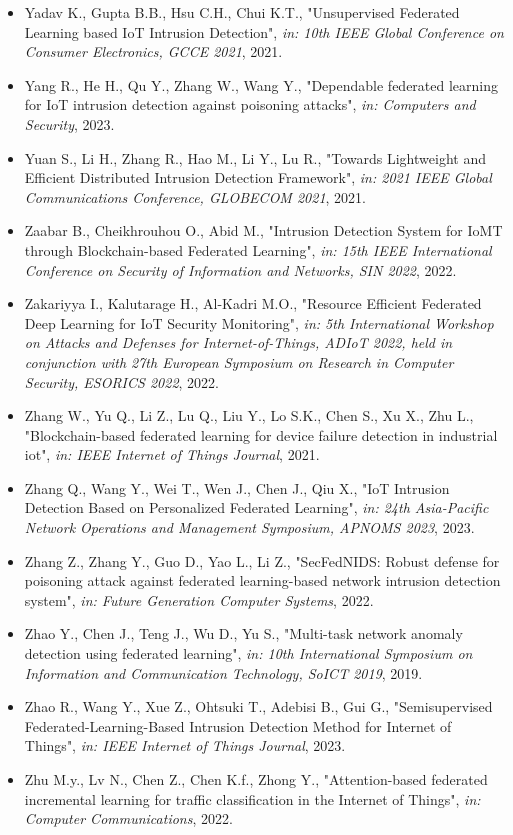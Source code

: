 \begin{itemize}
  \item Yadav K., Gupta B.B., Hsu C.H., Chui K.T., "Unsupervised Federated Learning based IoT Intrusion Detection", \textit{in: 10th IEEE Global Conference on Consumer Electronics, GCCE 2021}, 2021.
  \item Yang R., He H., Qu Y., Zhang W., Wang Y., "Dependable federated learning for IoT intrusion detection against poisoning attacks", \textit{in: Computers and Security}, 2023.
  \item Yuan S., Li H., Zhang R., Hao M., Li Y., Lu R., "Towards Lightweight and Efficient Distributed Intrusion Detection Framework", \textit{in: 2021 IEEE Global Communications Conference, GLOBECOM 2021}, 2021.
  \item Zaabar B., Cheikhrouhou O., Abid M., "Intrusion Detection System for IoMT through Blockchain-based Federated Learning", \textit{in: 15th IEEE International Conference on Security of Information and Networks, SIN 2022}, 2022.
  \item Zakariyya I., Kalutarage H., Al-Kadri M.O., "Resource Efficient Federated Deep Learning for IoT Security Monitoring", \textit{in: 5th International Workshop on Attacks and Defenses for Internet-of-Things, ADIoT 2022, held in conjunction with 27th European Symposium on Research in Computer Security, ESORICS 2022}, 2022.
  \item Zhang W., Yu Q., Li Z., Lu Q., Liu Y., Lo S.K., Chen S., Xu X., Zhu L., "Blockchain-based federated learning for device failure detection in industrial iot", \textit{in: IEEE Internet of Things Journal}, 2021.
  \item Zhang Q., Wang Y., Wei T., Wen J., Chen J., Qiu X., "IoT Intrusion Detection Based on Personalized Federated Learning", \textit{in: 24th Asia-Pacific Network Operations and Management Symposium, APNOMS 2023}, 2023.
  \item Zhang Z., Zhang Y., Guo D., Yao L., Li Z., "SecFedNIDS: Robust defense for poisoning attack against federated learning-based network intrusion detection system", \textit{in: Future Generation Computer Systems}, 2022.
  \item Zhao Y., Chen J., Teng J., Wu D., Yu S., "Multi-task network anomaly detection using federated learning", \textit{in: 10th International Symposium on Information and Communication Technology, SoICT 2019}, 2019.
  \item Zhao R., Wang Y., Xue Z., Ohtsuki T., Adebisi B., Gui G., "Semisupervised Federated-Learning-Based Intrusion Detection Method for Internet of Things", \textit{in: IEEE Internet of Things Journal}, 2023.
  \item Zhu M.y., Lv N., Chen Z., Chen K.f., Zhong Y., "Attention-based federated incremental learning for traffic classification in the Internet of Things", \textit{in: Computer Communications}, 2022.
\end{itemize}
